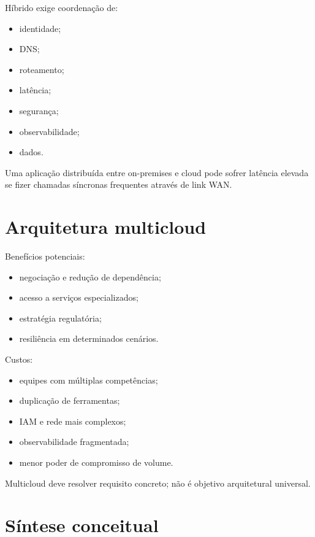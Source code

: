 Híbrido exige coordenação de:
\begin{itemize}
\item identidade;
\item DNS;
\item roteamento;
\item latência;
\item segurança;
\item observabilidade;
\item dados.
\end{itemize}

Uma aplicação distribuída entre on-premises e cloud pode sofrer latência elevada se fizer chamadas síncronas frequentes através de link WAN.

\section{Arquitetura multicloud}

Benefícios potenciais:
\begin{itemize}
\item negociação e redução de dependência;
\item acesso a serviços especializados;
\item estratégia regulatória;
\item resiliência em determinados cenários.
\end{itemize}

Custos:
\begin{itemize}
\item equipes com múltiplas competências;
\item duplicação de ferramentas;
\item IAM e rede mais complexos;
\item observabilidade fragmentada;
\item menor poder de compromisso de volume.
\end{itemize}

Multicloud deve resolver requisito concreto; não é objetivo arquitetural universal.

\section{Síntese conceitual}

